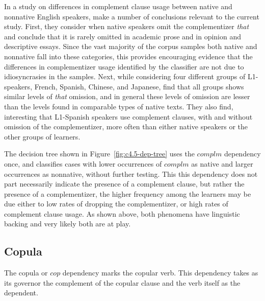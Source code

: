 \documentclass[main.tex]{subfiles}
\begin{document}
In a study on differences in complement clause usage between native and nonnative English speakers, \citet{biber:1998} make a number of conclusions relevant to the current study. First, they consider when native speakers omit the complementizer \textit{that} and conclude that it is rarely omitted in academic prose and in opinion and descriptive essays. Since the vast majority of the corpus samples both native and nonnative fall into these categories, this provides encouraging evidence that the differences in complementizer usage identified by the classifier are not due to idiosyncrasies in the samples. Next, while considering four different groups of L1-speakers, French, Spanish, Chinese, and Japanese, \citeauthor{biber:1998} find that all groups shows similar levels of \textit{that} omission, and in general these levels of omission are lesser than the levels found in comparable types of native texts. They also find, interesting that L1-Spanish speakers use complement clauses, with and without omission of the complementizer, more often than either native speakers or the other groups of learners.

The decision tree shown in Figure~\ref{fig:c4.5-dep-tree} uses the $complm$ dependency once, and classifies cases with lower occurrences of $complm$ as native and larger occurrences as nonnative, without further testing. This this dependency does not part necessarily indicate the presence of a complement clause, but rather the presence of a complementizer, the higher frequency among the learners may be due either to low rates of dropping the complementizer, or high rates of complement clause usage. As shown above, both phenomena have linguistic backing and very likely both are at play. 


\begin{figure}
\end{figure}

\subsection{Copula}

The copula or $cop$ dependency marks the copular verb. This dependency takes as its governor the complement of the copular clause and the verb itself as the dependent. 
\end{document}
